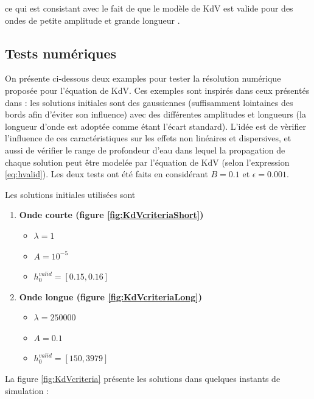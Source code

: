 \noindent ce qui est consistant avec le fait de que le modèle de KdV est valide pour des ondes de petite amplitude et grande longueur \cite{BBM1971}.

\subsection{Tests numériques}

\indent On présente ci-dessous deux examples pour tester la résolution numérique proposée pour l'équation de KdV. Ces exemples sont inspirés dans ceux présentés dans \cite{conservationLaws2002}: les solutions initiales sont des gaussiennes (suffisamment lointaines des bords afin d'éviter son influence) avec des différentes amplitudes et longueurs (la longueur d'onde est adoptée comme étant l'écart standard). L'idée est de vèrifier l'influence de ces caractéristiques sur les effets non linéaires et dispersives, et aussi de vérifier le range de profondeur d'eau dans lequel la propagation de chaque solution peut être modelée par l'équation de KdV (selon l'expression \ref{eq:hvalid}). Les deux tests ont été faits en considérant $B = 0.1$ et $\epsilon = 0.001$.

\indent Les solutions initiales utilisées sont

\begin{enumerate}
	\item \textbf{Onde courte (figure \ref{fig:KdVcriteriaShort})} %
		\begin{itemize}
			\item $\lambda = 1$
			\item $ A = 10^{-5}$
			\item $ h_0^{valid} = [0.15, 0.16] $
		\end{itemize}
	\item \textbf{Onde longue (figure \ref{fig:KdVcriteriaLong})} %
		\begin{itemize}
			\item $\lambda = 250000$
			\item $ A = 0.1$
			\item $ h_0^{valid} = [150, 3979] $
		\end{itemize}
\end{enumerate}

\indent La figure \ref{fig:KdVcriteria} présente les solutions dans quelques instants de simulation :


